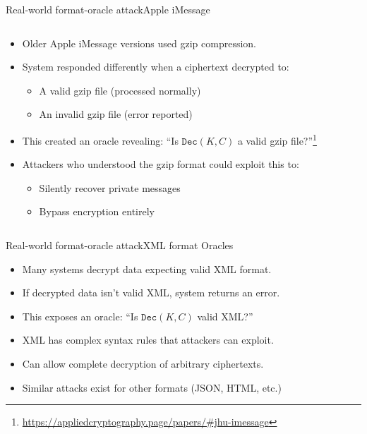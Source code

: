 \documentclass[aspectratio=169, lualatex, handout]{beamer}
\begin{document}
\begin{frame}{Real-world format-oracle attack}{Apple iMessage}
	\begin{columns}[c]
		\begin{column}{1\textwidth}
			\begin{itemize}[<+->]
				\item Older Apple iMessage versions used gzip compression.
				\item System responded differently when a ciphertext decrypted to:
				      \begin{itemize}
					      \item A valid gzip file (processed normally)
					      \item An invalid gzip file (error reported)
				      \end{itemize}
				\item This created an oracle revealing: ``Is $\texttt{Dec}(K, C)$ a valid gzip file?''\footnote{\url{https://appliedcryptography.page/papers/\#jhu-imessage}}
				\item Attackers who understood the gzip format could exploit this to:
				      \begin{itemize}
					      \item Silently recover private messages
					      \item Bypass encryption entirely
				      \end{itemize}
			\end{itemize}
		\end{column}
	\end{columns}
\end{frame}

\begin{frame}{Real-world format-oracle attack}{XML format Oracles}
	\begin{itemize}[<+->]
		\item Many systems decrypt data expecting valid XML format.
		\item If decrypted data isn't valid XML, system returns an error.
		\item This exposes an oracle: ``Is $\texttt{Dec}(K, C)$ valid XML?''
		\item XML has complex syntax rules that attackers can exploit.
		\item Can allow complete decryption of arbitrary ciphertexts.
		\item Similar attacks exist for other formats (JSON, HTML, etc.)
	\end{itemize}
\end{frame}
\end{document}
